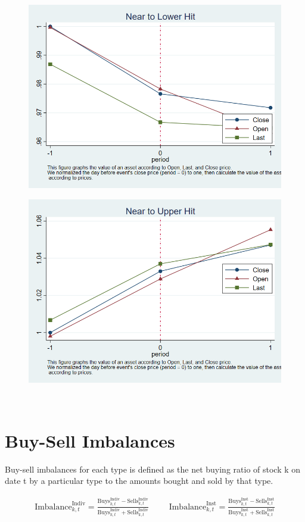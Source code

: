 \documentclass[12pt]{article}
\begin{document}
\begin{figure}[htbp]
\centering
\includegraphics[width=0.7\linewidth]{DCLT}
\caption{}
\label{fig:dclt}
\end{figure}
\begin{figure}[htbp]
\centering
\includegraphics[width=0.7\linewidth]{DCUT}
\caption{}
\label{fig:dcut}
\end{figure}
\FloatBarrier

\linespread{1.5}
\begin{table}[htbp]
\centering

{}
\end{table}

\FloatBarrier

‌ %
‌ %

\section{Buy-Sell Imbalances}
Buy-sell imbalances for each type is defined as the net buying ratio of stock k on date t by a particular type to the amounts bought and sold by that type.

\begin{equation*}
\begin{matrix}
\text{Imbalance}_{k,t}^{\text{Indiv}} = \frac{\text{Buys}_{k,t}^{\text{Indiv}} - \text{Sells}_{k,t}^{\text{Indiv}}}{\text{Buys}_{k,t}^{\text{Indiv}} + \text{Sells}_{k,t}^{\text{Indiv}}} & & &  \text{Imbalance}_{k,t}^{\text{Inst}} = \frac{\text{Buys}_{k,t}^{\text{Inst}} - \text{Sells}_{k,t}^{\text{Inst}}}{\text{Buys}_{k,t}^{\text{Inst}} + \text{Sells}_{k,t}^{\text{Inst}}}
\end{matrix}
\end{equation*}
\end{document}
